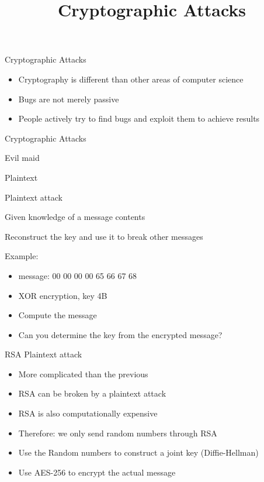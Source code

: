 

\title[]{Cryptographic Attacks}

\begin{frame}
\titlepage
\end{frame}

\begin{withoutheadline}

\begin{frame}{Cryptographic Attacks}
\begin{itemize}
    \item Cryptography is different than other areas of computer science
    \item Bugs are not merely passive
    \item People actively try to find bugs and exploit them to achieve results
\end{itemize}
\end{frame}

\begin{frame}{Cryptographic Attacks}
    \item Evil maid
    \item Plaintext
    \item 
    \item
    \item
    \item
    \item
\end{frame}

\begin{frame}{Plaintext attack}
    \item Given knowledge of a message contents
    \item Reconstruct the key and use it to break other messages
    \item Example:
    \begin{itemize}
        \item message: 00 00 00 00 65 66 67 68
        \item XOR encryption, key 4B
        \item Compute the message
        \item Can you determine the key from the encrypted message?
    \end{itemize}
\end{frame}

\begin{frame}{RSA Plaintext attack}
\begin{itemize}
    \item More complicated than the previous
    \item RSA can be broken by a plaintext attack
    \item RSA is also computationally expensive
    \item Therefore: we only send random numbers through RSA
    \item Use the Random numbers to construct a joint key (Diffie-Hellman)
    \item Use AES-256 to encrypt the actual message
\end{itemize}
\end{frame}


\end{withoutheadline}
